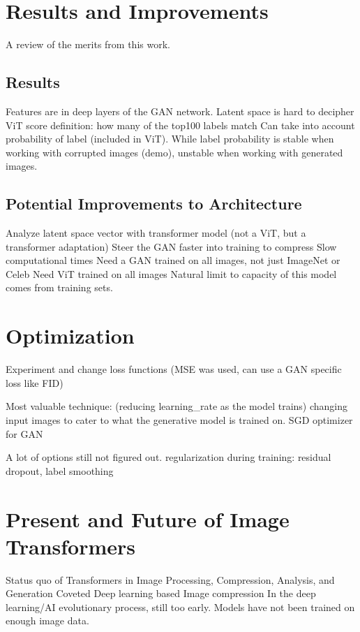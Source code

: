\section{Results and Improvements}
A review of the merits from this work.

\subsection{Results}

Features are in deep layers of the GAN network. 
Latent space is hard to decipher
ViT score definition: how many of the top100 labels match
Can take into account probability of label (included in ViT).
While label probability is stable when working with corrupted images (demo), 
unstable when working with generated images.

\subsection{Potential Improvements to Architecture}

Analyze latent space vector with transformer model (not a ViT, but a transformer adaptation)
Steer the GAN faster into training to compress
Slow computational times
Need a GAN trained on all images, not just ImageNet or Celeb 
Need ViT trained on all images
Natural limit to capacity of this model comes from training sets.

\section{Optimization}

Experiment and change loss functions (MSE was used, can use a GAN specific loss like FID)

Most valuable technique:
(reducing learning\_rate as the model trains)
changing input images to cater to what the generative model is trained on.
SGD optimizer for GAN

A lot of options still not figured out.
regularization during training: residual dropout, label smoothing


\section{Present and Future of Image Transformers}
Status quo of Transformers in Image Processing, Compression, Analysis, and Generation
Coveted Deep learning based Image compression 
In the deep learning/AI evolutionary process, still too early. Models have not been trained on enough image data.

